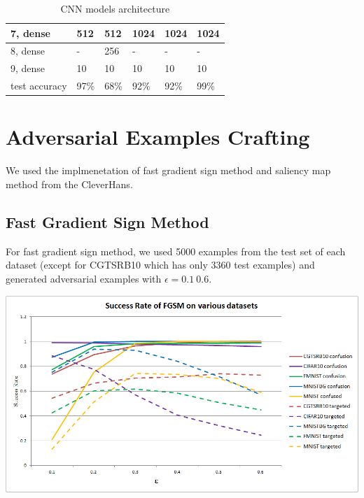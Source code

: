 \documentclass{article}
\begin{document}
\begin{table}
\begin{tabular}{llllll}
    7, dense &
        512 &
        512 &
        1024 &
        1024 &
        1024 \\
    \midrule

    8, dense &
        - &
        256 &
        - &
        - &
        - \\
    \midrule

    9, dense &
        10 &
        10 &
        10 &
        10 &
        10 \\

    \midrule

    test accuracy &
        97\% &
        68\% &
        92\% &
        92\% &
        99\% \\

    \bottomrule
\end{tabular}
\caption{\label{tab:cnnarch} CNN models architecture}
\end{table}


\section{Adversarial Examples Crafting}

We used the implmenetation of fast gradient sign method and saliency map method from the CleverHans\cite{cleverhans}.

\subsection{Fast Gradient Sign Method}

For fast gradient sign method, we used 5000 examples from the test set of each dataset (except for CGTSRB10 which has only 3360 test examples) and generated adversarial examples with \(\epsilon=0.1~0.6\).

\includegraphics[scale=0.45]{fgsm}
\end{document}
